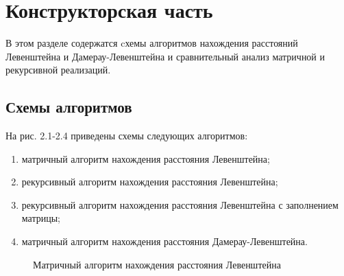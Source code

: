 \documentclass[12pt]{report}
\begin{document}
\chapter{Конструкторская часть}
В этом разделе содержатся cхемы алгоритмов нахождения расстояний Левенштейна и Дамерау-Левенштейна и сравнительный анализ матричной и рекурсивной реализаций.

\section{Схемы алгоритмов}
На рис. 2.1-2.4 приведены схемы следующих алгоритмов:
\begin{enumerate}
	\item матричный алгоритм нахождения расстояния Левенштейна;
	\item рекурсивный алгоритм нахождения расстояния Левенштейна;
	\item рекурсивный алгоритм нахождения расстояния Левенштейна с заполнением 
	матрицы;
	\item матричный алгоритм нахождения расстояния Дамерау-Левенштейна.
\end{enumerate}
\newpage
\begin{figure}[h]
	\caption{Матричный алгоритм нахождения расстояния Левенштейна}
	\label{figure:image}
\end{figure}
\newpage
\end{document}
